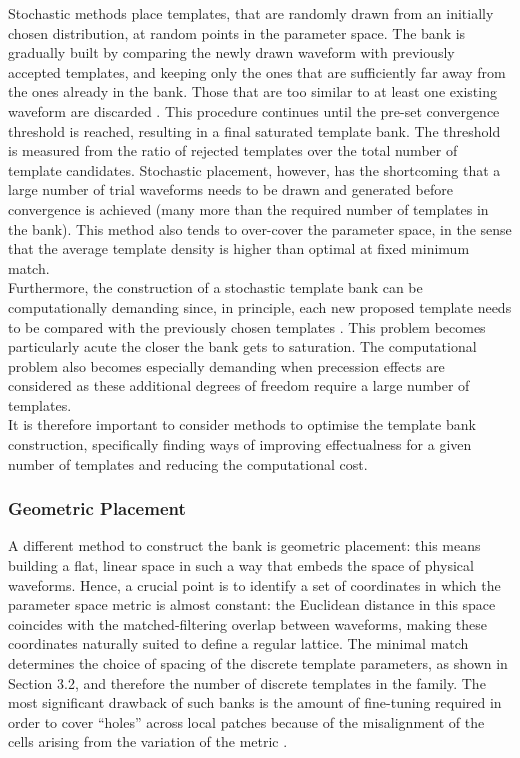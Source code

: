 \documentclass[binding=0.6cm, LaM]{sapthesis}
\begin{document}
	Stochastic methods place templates, 
	that are randomly drawn from an initially chosen distribution, 
	at random points in the parameter space.
	The bank is gradually built by comparing the newly drawn waveform
	with previously accepted templates, 
	and keeping only the ones that are sufficiently far away 
	from the ones already in the bank.
 	Those that are too similar to at least one existing waveform are discarded \cite{35}.
	This procedure continues until the pre-set convergence threshold is reached, 
	resulting in a final saturated template bank.
	The threshold is measured from the ratio of rejected templates over the total number of template candidates.
	Stochastic placement, however, has the shortcoming that 
	a large number of trial waveforms needs to be drawn and generated before convergence is achieved 
	(many more than the required number of templates in the bank). 
	This method also tends to over-cover the parameter space, 
	in the sense that the average template density is higher than optimal at fixed minimum match. \\
	Furthermore, the construction of a stochastic template bank 
	can be computationally demanding since, in principle, 
	each new proposed template needs to be compared 
	with the previously chosen templates \cite{36}. 
	This problem becomes particularly acute 
	the closer the bank gets to saturation. 
	The computational problem also becomes especially demanding 
	when precession effects are considered as these additional degrees 
	of freedom require a large number of templates. \\
	It is therefore important to consider methods to optimise the template bank construction, 
	specifically finding ways of improving effectualness for a given number 
	of templates and reducing the computational cost. 

\subsubsection{Geometric Placement}


	A different method to construct the bank is geometric placement:
	this means building a flat, linear space in such a way that embeds the space of physical waveforms. 
	Hence, a crucial point is to identify a set of coordinates 
	in which the parameter space metric is almost constant: 
	the Euclidean distance in this space coincides with the matched-filtering overlap 
	between waveforms, making these coordinates naturally suited to define a regular lattice. 
	The minimal match determines the choice of spacing of the discrete template parameters, as shown in Section 3.2, 
	and therefore the number of discrete templates in the family.
	The most significant drawback of such banks is the amount of fine-tuning required 
	in order to cover ``holes'' across local patches because of the misalignment 
	of the cells arising from the variation of the metric \cite{29}. 
\end{document}
